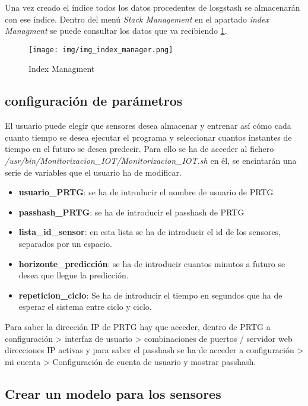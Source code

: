 Una vez creado el índice todos los datos procedentes de losgstash se almacenarán con ese índice.
Dentro del menú \textit{Stack Management} en el apartado \textit{index Managment} se puede consultar los datos que va recibiendo \ref{img_index_manager.png}.

\begin{figure}[h]
	\centering
	\texttt{[image: img/img\_index\_manager.png]}
	\caption{Index Managment}
	\label{img_index_manager.png}
\end{figure}

\newpage

\subsection{configuración de parámetros}

El usuario puede elegir que sensores desea almacenar y entrenar así cómo cada cuanto tiempo se desea ejecutar el programa y seleccionar cuantos instantes de tiempo en el futuro se desea predecir. Para ello se ha de acceder al fichero \textit{/usr/bin/Monitorizacion\_IOT/Monitorizacion\_IOT.sh} en él, se encintarán una serie de variables que el usuario ha de modificar.

\begin{itemize}
    \item \textbf{usuario\_PRTG}: se ha de introducir el nombre de usuario de PRTG
    \item \textbf{passhash\_PRTG}: se ha de introducir el passhash de PRTG
    \item \textbf{lista\_id\_sensor}: en esta lista se ha de introducir el id de los sensores, separados por un espacio.
    \item \textbf{horizonte\_predicción}: se ha de introducir cuantos minutos a futuro se desea que llegue la predicción.
    \item \textbf{repeticion\_ciclo}: Se ha de introducir el tiempo en segundos que ha de esperar el sistema entre ciclo y ciclo. 
\end{itemize}

Para saber la dirección IP de PRTG hay que acceder, dentro de PRTG a configuración > interfaz de usuario > combinaciones de puertos / servidor web direcciones IP activas y para saber el passhash se ha de acceder a configuración > mi cuenta > Configuración de cuenta de usuario y mostrar passhash.

\subsection{Crear un modelo para los sensores}

